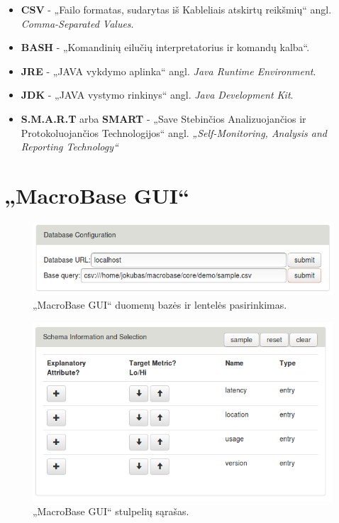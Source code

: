 \documentclass{VUMIFPSkursinis}
\begin{document}
\begin{itemize}
\item \textbf{CSV} - „Failo formatas, sudarytas iš Kableliais atskirtų reikšmių“ angl. \textit{Comma-Separated Values}.

\item \textbf{BASH} - „Komandinių eilučių interpretatorius ir komandų kalba“.

\item \textbf{JRE} - „JAVA vykdymo aplinka“ angl. \textit{Java Runtime Environment}.

\item \textbf{JDK} - „JAVA vystymo rinkinys“ angl. \textit{Java Development Kit}.

\item \textbf{S.M.A.R.T} arba \textbf{SMART} - „Save Stebinčios Analizuojančios ir Protokoluojančios Technologijos“ angl. \textit{„Self-Monitoring, Analysis and Reporting Technology“}

\end{itemize}

\appendix

\section{„MacroBase GUI“} \label{sec:macrogui}
\begin{figure}[H]
    \centering
    \includegraphics[scale=0.5]{img/query}
    \caption{„MacroBase GUI“ duomenų bazės ir lentelės pasirinkimas.}
    \label{img:query}
\end{figure}

\begin{figure}[H]
    \centering
    \includegraphics[scale=0.5]{img/all}
    \caption{„MacroBase GUI“ stulpelių sąrašas.}
    \label{img:all}
\end{figure}
\end{document}

